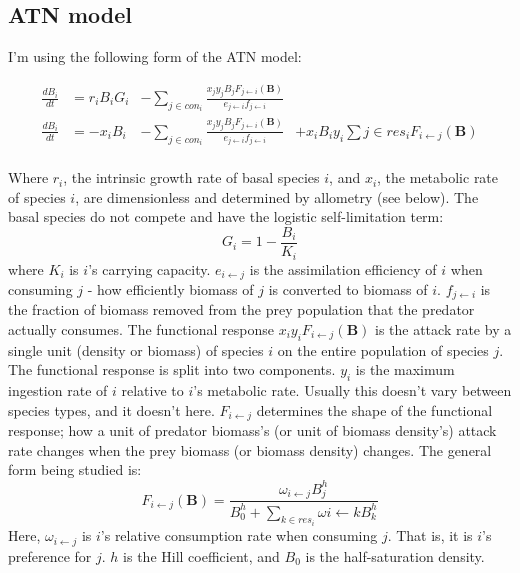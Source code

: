 \documentclass[11pt]{amsart}
\begin{document}
\subsection{ATN model}

I'm using the following form of the ATN model:

\begin{align*}
\frac{dB_{i}}{dt} &= r_i B_i G_i &-\sum_{j \in con_i} \frac{x_jy_jB_jF_{j\leftarrow i}(\mathbf{B})}{e_{j\leftarrow i}f_{j\leftarrow i}}&\\
\frac{dB_{i}}{dt} &= -x_iB_i &-\sum_{j \in con_i} \frac{x_jy_jB_jF_{j\leftarrow i}(\mathbf{B})}{e_{j\leftarrow i}f_{j\leftarrow i}} &+ x_iB_iy_i\sum{j\in res_i} F_{i\leftarrow j}(\mathbf{B}) \\
\end{align*}

Where $r_i$, the intrinsic growth rate of basal species $i$, and $x_i$, the metabolic rate of species $i$, are dimensionless and determined by allometry (see below).  The basal species do not compete and have the logistic self-limitation term: 
\[
G_i = 1 - \frac{B_i}{K_i}
\]
where $K_i$ is $i$'s carrying capacity.  $e_{i\leftarrow j}$ is the assimilation efficiency of $i$ when consuming $j$ - how efficiently biomass of $j$ is converted to biomass of $i$.  $f_{j\leftarrow i}$ is the fraction of biomass removed from the prey population that the predator actually consumes.  The functional response $x_iy_iF_{i\leftarrow j}(\mathbf{B})$ is the attack rate by a single unit (density or biomass) of species $i$ on the entire population of species $j$.  The functional response is split into two components.  $y_i$  is the maximum ingestion rate of $i$ relative to $i$'s metabolic rate.  Usually this doesn't vary between species types, and it doesn't here.  $F_{i\leftarrow j}$ determines the shape of the functional response; how a unit of predator biomass's (or unit of biomass density's) attack rate changes when the prey biomass (or biomass density) changes.  The general form being studied is:
\[
F_{i\leftarrow j}(\mathbf{B}) = \frac{\omega_{i\leftarrow j}B_j^h}{B_0^h + \sum_{k\in res_i}\omega{i\leftarrow k}B_k^h}
\]
Here, $\omega_{i\leftarrow j}$ is $i$'s relative consumption rate when consuming $j$.  That is, it is $i$'s preference for $j$.  $h$ is the Hill coefficient, and $B_0$ is the half-saturation density.
\end{document}
